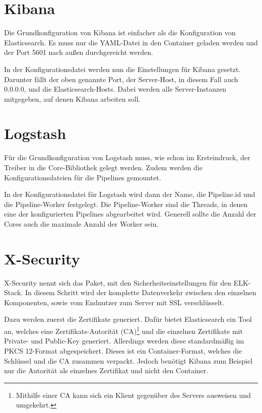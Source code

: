 \section{Kibana}

Die Grundkonfiguration von Kibana ist einfacher als die Konfiguration von Elasticsearch. Es muss nur die YAML-Datei in den Container geladen werden und der Port 5601 nach außen durchgereicht werden.

In der Konfigurationsdatei werden nun die Einstellungen für Kibana gesetzt. Darunter fällt der oben genannte Port, der Server-Host, in diesem Fall auch 0.0.0.0, und die Elasticsearch-Hosts. Dabei werden alle Server-Instanzen mitgegeben, auf denen Kibana arbeiten soll. 

\section{Logstash}

Für die Grundkonfiguration von Logstash muss, wie schon im Ersteindruck, der Treiber in die Core-Bibliothek gelegt werden. Zudem werden die Konfigurationsdateien für die Pipelines gemountet.

In der Konfigurationsdatei für Logstash wird dann der Name, die Pipeline.id und die Pipeline-Worker festgelegt. Die Pipeline-Worker sind die Threads, in denen eine der konfigurierten Pipelines abgearbeitet wird. Generell sollte die Anzahl der Cores auch die maximale Anzahl der Worker sein.


\section{X-Security}

X-Security nennt sich das Paket, mit den Sicherheitseinstellungen für den ELK-Stack. In diesem Schritt wird der komplette Datenverkehr zwischen den einzelnen Komponenten, sowie vom Endnutzer zum Server mit SSL verschlüsselt. 

Dazu werden zuerst die Zertifikate generiert. Dafür bietet Elasticsearch ein Tool an, welches eine Zertifikats-Autorität (CA)\footnote{Mithilfe einer CA kann sich ein Klient gegenüber des Servers ausweisen und umgekehrt.} und die einzelnen Zertifikate mit Private- und Public-Key generiert. Allerdings werden diese standardmäßig im PKCS 12-Format abgespeichert. Dieses ist ein Container-Format, welches die Schlüssel und die CA zusammen verpackt. Jedoch benötigt Kibana zum Beispiel nur die Autorität als einzelnes Zertifikat und nicht den Container.

